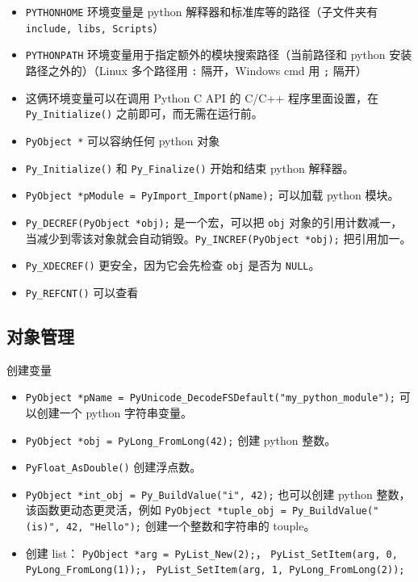 

\begin{itemize}
\item \verb`PYTHONHOME` 环境变量是 python 解释器和标准库等的路径（子文件夹有 \verb`include, libs, Scripts`）
\item \verb`PYTHONPATH` 环境变量用于指定额外的模块搜索路径（当前路径和 python 安装路径之外的）（Linux 多个路径用 \verb`:` 隔开，Windows cmd 用 \verb`;` 隔开）
\item 这俩环境变量可以在调用 Python C API 的 C/C++ 程序里面设置，在 \verb`Py_Initialize()` 之前即可，而无需在运行前。
\item \verb`PyObject *` 可以容纳任何 python 对象
\item \verb`Py_Initialize()` 和 \verb`Py_Finalize()` 开始和结束 python 解释器。
\item \verb`PyObject *pModule = PyImport_Import(pName);` 可以加载 python 模块。
\item \verb`Py_DECREF(PyObject *obj);` 是一个宏，可以把 \verb`obj` 对象的引用计数减一， 当减少到零该对象就会自动销毁。\verb`Py_INCREF(PyObject *obj);` 把引用加一。
\item \verb`Py_XDECREF()` 更安全，因为它会先检查 \verb`obj` 是否为 \verb`NULL`。
\item \verb`Py_REFCNT()` 可以查看
\end{itemize}

\subsection{对象管理}
创建变量
\begin{itemize}
\item \verb`PyObject *pName = PyUnicode_DecodeFSDefault("my_python_module");` 可以创建一个 python 字符串变量。
\item \verb`PyObject *obj = PyLong_FromLong(42);` 创建 python 整数。
\item \verb`PyFloat_AsDouble()` 创建浮点数。
\item \verb`PyObject *int_obj = Py_BuildValue("i", 42);` 也可以创建 python 整数，该函数更动态更灵活，例如 \verb`PyObject *tuple_obj = Py_BuildValue("(is)", 42, "Hello");` 创建一个整数和字符串的 touple。
\item 创建 list： \verb`PyObject *arg = PyList_New(2);`， \verb`PyList_SetItem(arg, 0, PyLong_FromLong(1));`， \verb`PyList_SetItem(arg, 1, PyLong_FromLong(2));`
\end{itemize}


